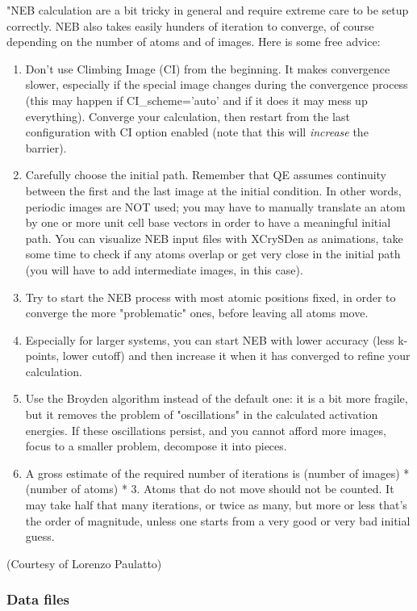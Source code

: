 \documentclass[12pt,a4paper]{article}
\begin{document}
"NEB calculation are a bit tricky in general and require extreme care to be
setup correctly. NEB also takes easily hunders of iteration to converge,
of course depending on the number of atoms and of images. Here is some
free advice:
\begin{enumerate}
\item 
Don't use Climbing Image (CI) from the beginning. It makes convergence slower, 
especially if the special image changes during the convergence process (this 
may happen if CI\_scheme='auto' and if it does it may mess up everything).
Converge your calculation, then restart from the last configuration with
CI option enabled (note that this will {\em increase} the barrier).
\item
Carefully choose the initial path. Remember that QE assumes continuity
between the first and the last image at the initial condition. In other 
words, periodic images are NOT used; you may have to manually translate
an atom by one or more unit cell base vectors in order to have a meaningful
initial path. You can visualize NEB input files with XCrySDen as animations,
take some time to check if any atoms overlap or get very close in the initial
path (you will have to add intermediate images, in this case).
\item
Try to start the NEB process with most atomic positions fixed, 
in order to converge the more "problematic" ones, before leaving
all atoms move.
\item
Especially for larger systems, you can start NEB with lower accuracy 
(less k-points, lower cutoff) and then increase it when it has
converged to refine your calculation.
\item
Use the Broyden algorithm instead of the default one: it is a bit more
fragile, but it removes the problem of "oscillations" in the calculated
activation energies. If these oscillations persist, and you cannot afford 
more images, focus to a smaller problem, decompose it into pieces.
\item
A gross estimate of the required number of iterations is
(number of images) * (number of atoms) * 3. Atoms that do not
move should not be counted. It may take half that many iterations, 
or twice as many, but more or less that's the order of magnitude, 
unless one starts from a very good or very bad initial guess.
\end{enumerate}
(Courtesy of Lorenzo Paulatto)

\subsubsection{Data files}
\end{document}
